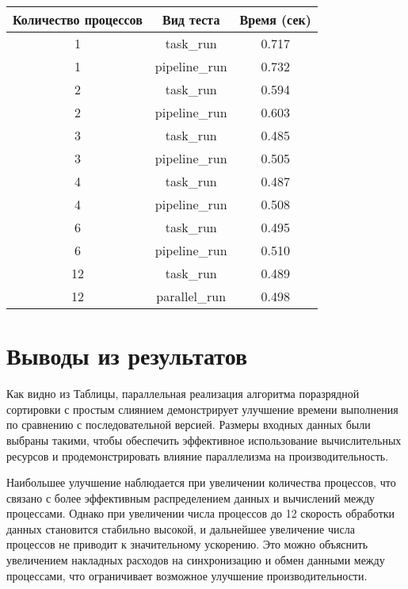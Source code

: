 \documentclass[12pt]{article}
\begin{document}
\begin{table}[htbp]
\centering
\begin{tabular}{|c|c|c|}
    \hline
    \textbf{Количество процессов} & \textbf{Вид теста} & \textbf{Время (сек)} \\ \hline
    1 & task\_run & 0.717 \\ \hline
    1 & pipeline\_run & 0.732 \\ \hline
    2 & task\_run & 0.594 \\ \hline
    2 & pipeline\_run & 0.603 \\ \hline
    3 & task\_run & 0.485 \\ \hline
    3 & pipeline\_run & 0.505 \\ \hline
    4 & task\_run & 0.487 \\ \hline
    4 & pipeline\_run & 0.508 \\ \hline
    6 & task\_run & 0.495 \\ \hline
    6 & pipeline\_run & 0.510 \\ \hline
    12 & task\_run & 0.489 \\ \hline
    12 & parallel\_run & 0.498 \\ \hline
\end{tabular}
\label{tab:performance_results}
\end{table}

\newpage

\section*{Выводы из результатов}

\hspace*{1.25em}Как видно из Таблицы, параллельная реализация алгоритма поразрядной сортировки с простым слиянием демонстрирует улучшение времени выполнения по сравнению с последовательной версией. Размеры входных данных были выбраны такими, чтобы обеспечить эффективное использование вычислительных ресурсов и продемонстрировать влияние параллелизма на производительность.

Наибольшее улучшение наблюдается при увеличении количества процессов, что связано с более эффективным распределением данных и вычислений между процессами. Однако при увеличении числа процессов до 12 скорость обработки данных становится стабильно высокой, и дальнейшее увеличение числа процессов не приводит к значительному ускорению. Это можно объяснить увеличением накладных расходов на синхронизацию и обмен данными между процессами, что ограничивает возможное улучшение производительности.
\end{document}
